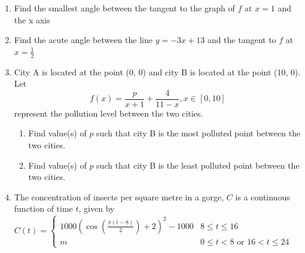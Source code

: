 \documentclass[12pt]{article}
\begin{document}
   \begin{enumerate}
        \item Find the smallest angle between the tangent to the graph of $f$ at $x = 1$ and the x axis
        \item Find the acute angle between the line $y = -3x + 13$ and the tangent to $f$ at $x = \frac{1}{2}$





    \item City A is located at the point (0, 0) and city B is located at the point (10, 0). Let $$f(x) = \frac{p}{x+1}+\frac{4}{11-x}, x \in [0,10]$$ represent the pollution level between the two cities.
    \begin{enumerate}
        \item Find value(s) of $p$ such that city B is the most polluted point between the two cities.
        \item Find value(s) of $p$ such that city B is the least polluted point between the two cities.
    \end{enumerate}
    \item The concentration of insects per square metre in a gorge, $C$ is a continuous function of time $t$, given by
    $C(t) = \begin{cases} 1000 \left( \cos \left( \frac{\pi(t-8)}{2} \right) + 2 \right)^2 - 1000 & 8 \leq t \leq 16 \\ m & 0 \leq t < 8 \text{ or } 16 < t \leq 24 \end{cases}$
    

\end{enumerate}
\end{document}
